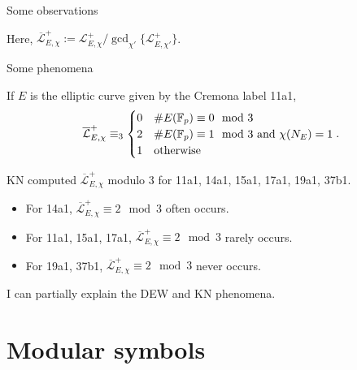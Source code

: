 \documentclass[10pt]{beamer}
\begin{document}
\begin{frame}[t]{Some observations}
\begin{example}
\vspace{0.2cm}

\end{example}

\pause

Here, $ \overline{\mathcal{L}}_{E, \chi}^+ := \mathcal{L}_{E, \chi}^+ / \gcd_{\chi'}\{\mathcal{L}_{E, \chi'}^+\} $.

\end{frame}

\begin{frame}[t]{Some phenomena}

If $ E $ is the elliptic curve given by the Cremona label 11a1,
\vspace{-0.2cm} $$ \vspace{-0.2cm} \overline{\mathcal{L}}_{E, \chi}^+ \equiv_3
\begin{cases}
0 & \#E(\mathbb{F}_p) \equiv 0 \mod 3 \\
2 & \#E(\mathbb{F}_p) \equiv 1 \mod 3 \ \text{and} \ \chi(N_E) = 1 \\
1 & \text{otherwise}
\end{cases}.
$$

\pause

KN computed $ \overline{\mathcal{L}}_{E, \chi}^+ $ modulo $ 3 $ for 11a1, 14a1, 15a1, 17a1, 19a1, 37b1.

\pause

\begin{itemize}
\item For 14a1, $ \overline{\mathcal{L}}_{E, \chi}^+ \equiv 2 \mod 3 $ often occurs.

\pause

\item For 11a1, 15a1, 17a1, $ \overline{\mathcal{L}}_{E, \chi}^+ \equiv 2 \mod 3 $ rarely occurs.

\pause

\item For 19a1, 37b1, $ \overline{\mathcal{L}}_{E, \chi}^+ \equiv 2 \mod 3 $ never occurs.
\end{itemize}

\pause

\vspace{0.5cm}

\begin{theorem}[A.]
I can partially explain the DEW and KN phenomena.
\end{theorem}

\end{frame}

\section{Modular symbols}
\end{document}
